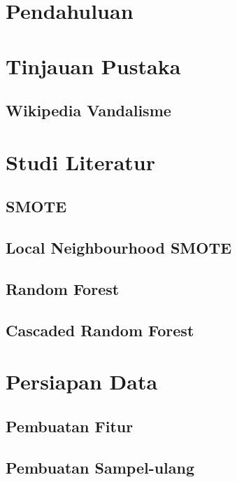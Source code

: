 





\newpage
{}


\chapter{Pendahuluan}

\chapter{Tinjauan Pustaka}
\section{Wikipedia Vandalisme}

\chapter{Studi Literatur}
\section{SMOTE}
\section{Local Neighbourhood SMOTE}
\section{Random Forest}
\section{Cascaded Random Forest}

\chapter{Persiapan Data}
\section{Pembuatan Fitur}
\section{Pembuatan Sampel-ulang}






